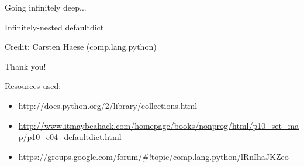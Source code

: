 \documentclass{beamer}
\begin{document}
\begin{frame}{Going infinitely deep...}

Infinitely-nested defaultdict

\usebox{\mysavebox}

\bigskip
Credit: Carsten Haese (comp.lang.python)

\end{frame}

\begin{frame}{Thank you!}

Resources used:
\begin{itemize}
  \item \url{http://docs.python.org/2/library/collections.html}
  \item \url{http://www.itmaybeahack.com/homepage/books/nonprog/html/p10_set_map/p10_c04_defaultdict.html}
  \item \url{https://groups.google.com/forum/\#!topic/comp.lang.python/lRnIhaJKZeo}
\end{itemize}

\end{frame}
\end{document}

